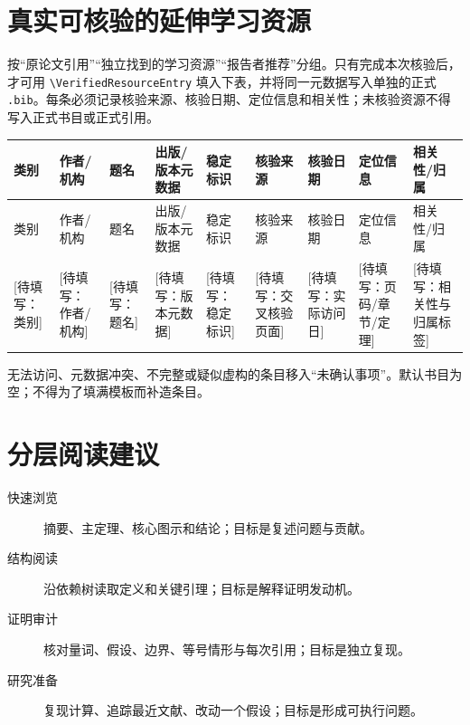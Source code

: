 \documentclass[UTF8,11pt,a4paper,fontset=fandol]{ctexart}
\theoremstyle{definition}
\theoremstyle{remark}
\newcommand{\Placeholder}[1]{\textcolor{magenta!70!black}{[待填写：#1]}}
\newcommand{\VerifiedResourceEntry}[9]{%
  #1 & #2 & #3 & #4 & #5 & #6 & #7 & #8 & #9 \\
}
\begin{document}
\section{真实可核验的延伸学习资源}
按“原论文引用”“独立找到的学习资源”“报告者推荐”分组。只有完成本次核验后，才可用 \verb|\VerifiedResourceEntry| 填入下表，并将同一元数据写入单独的正式 \texttt{.bib}。每条必须记录核验来源、核验日期、定位信息和相关性；未核验资源不得写入正式书目或正式引用。

\begingroup
\tiny
\setlength{\tabcolsep}{1.2pt}
\begin{longtable}{p{}p{}p{}p{}p{}p{}p{}p{}p{}}
\toprule
类别 & 作者/机构 & 题名 & 出版/版本元数据 & 稳定标识 & 核验来源 & 核验日期 & 定位信息 & 相关性/归属 \\
\midrule
\endfirsthead
\toprule
类别 & 作者/机构 & 题名 & 出版/版本元数据 & 稳定标识 & 核验来源 & 核验日期 & 定位信息 & 相关性/归属 \\
\midrule
\endhead
\bottomrule
\endfoot
\VerifiedResourceEntry{\Placeholder{类别}}{\Placeholder{作者/机构}}{\Placeholder{题名}}{\Placeholder{版本元数据}}{\Placeholder{稳定标识}}{\Placeholder{交叉核验页面}}{\Placeholder{实际访问日}}{\Placeholder{页码/章节/定理}}{\Placeholder{相关性与归属标签}}
\end{longtable}
\endgroup
无法访问、元数据冲突、不完整或疑似虚构的条目移入“未确认事项”。默认书目为空；不得为了填满模板而补造条目。

\section{分层阅读建议}
\begin{description}
  \item[快速浏览] 摘要、主定理、核心图示和结论；目标是复述问题与贡献。
  \item[结构阅读] 沿依赖树读取定义和关键引理；目标是解释证明发动机。
  \item[证明审计] 核对量词、假设、边界、等号情形与每次引用；目标是独立复现。
  \item[研究准备] 复现计算、追踪最近文献、改动一个假设；目标是形成可执行问题。
\end{description}
\end{document}
